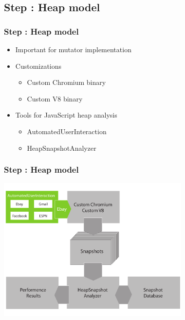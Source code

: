 	
\subsection{Step \theStepCounter: Heap model}
\begin{frame}
	\frametitle{Step \theStepCounter: Heap model}
	\begin{itemize}
		\item Important for mutator implementation
		\item Customizations
		\begin{itemize}
			\item Custom Chromium binary
			\item Custom V8 binary
		\end{itemize}
			
		\pause
			
		\item Tools for JavaScript heap analysis
		\begin{itemize}
			\item AutomatedUserInteraction
			\item HeapSnapshotAnalyzer
		\end{itemize}
	\end{itemize}
\end{frame}
	
\begin{frame}
	\frametitle{Step \theStepCounter: Heap model}		
	\includegraphics[width=26em]{../imgs/solution_h_1.pdf}
\end{frame}

